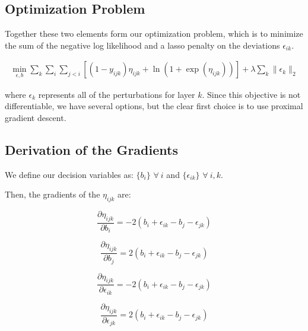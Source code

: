 \documentclass{article}
\begin{document}
\subsection{Optimization Problem}

Together these two elements form our optimization problem, which is to minimize the sum of the negative log likelihood and a lasso penalty on the deviations $\epsilon_{ik}$.

\begin{align*}
\min_{\epsilon, b} \sum_k \sum_{i} \sum_{j < i} [ (1 - y_{ijk})\eta_{ijk} +  \ln (1+\exp(\eta_{ijk})) ] + \lambda \sum_k \| \epsilon_{k}\|_2
\end{align*}

where $\epsilon_k$ represents all of the perturbations for layer $k$. Since this objective is not differentiable, we have several options, but the clear first choice is to use proximal gradient descent. %

\subsection{Derivation of the Gradients}

We define our decision variables as: $\{b_i\}$ $\forall~i$ and $\{\epsilon_{ik}\}$ $\forall~i,k$.

Then, the gradients of the $\eta_{ijk}$ are:

\[
\frac{\partial \eta_{ijk}}{\partial b_{i}} =  - 2(b_i + \epsilon_{ik} - b_j - \epsilon_{jk})
\]

\[
\frac{\partial \eta_{ijk}}{\partial b_{j}} = 2(b_i + \epsilon_{ik} - b_j - \epsilon_{jk})
\]

\[
\frac{\partial \eta_{ijk}}{\partial \epsilon_{ik}} = - 2(b_i + \epsilon_{ik} - b_j - \epsilon_{jk})
\]

\[
\frac{\partial \eta_{ijk}}{\partial \epsilon_{jk}} = 2(b_i + \epsilon_{ik} - b_j - \epsilon_{jk})
\]
\end{document}
